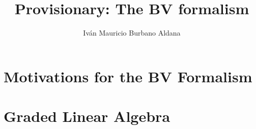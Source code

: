 \documentclass{book}
\title{Provisionary: The BV formalism}
\author{Iván Mauricio Burbano Aldana}
\theoremstyle{definition}
\begin{document}
\maketitle

\tableofcontents

\chapter{Motivations for the BV Formalism}\label{ch:motivations}


\chapter{Graded Linear Algebra}


\printbibliography
\end{document}
